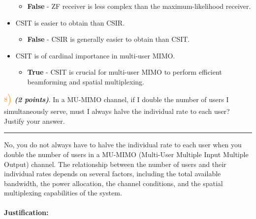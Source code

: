 \documentclass[11pt]{article}
\providecommand{\tightlist}{%
      \setlength{\itemsep}{0pt}\setlength{\parskip}{0pt}}
\begin{document}
\begin{itemize}
  \begin{itemize}
  \tightlist
  \item
    \textbf{False} - ZF receiver is less complex than the
    maximum-likelihood receiver.
  \end{itemize}
\item
  CSIT is easier to obtain than CSIR.

  \begin{itemize}
  \tightlist
  \item
    \textbf{False} - CSIR is generally easier to obtain than CSIT.
  \end{itemize}
\item
  CSIT is of cardinal importance in multi-user MIMO.

  \begin{itemize}
  \tightlist
  \item
    \textbf{True} - CSIT is crucial for multi-user MIMO to perform
    efficient beamforming and spatial multiplexing.
  \end{itemize}
\end{itemize}

    \(\color{orange}8\Bigl)\) \textbf{\emph{(2 points)}}. In a MU-MIMO
channel, if I double the number of users I simultaneously serve, must I
always halve the individual rate to each user? Justify your answer.

    \begin{center}\rule{0.5\linewidth}{0.5pt}\end{center}

No, you do not always have to halve the individual rate to each user
when you double the number of users in a MU-MIMO (Multi-User Multiple
Input Multiple Output) channel. The relationship between the number of
users and their individual rates depends on several factors, including
the total available bandwidth, the power allocation, the channel
conditions, and the spatial multiplexing capabilities of the system.

\paragraph{Justification:}\label{justification}
\end{document}
